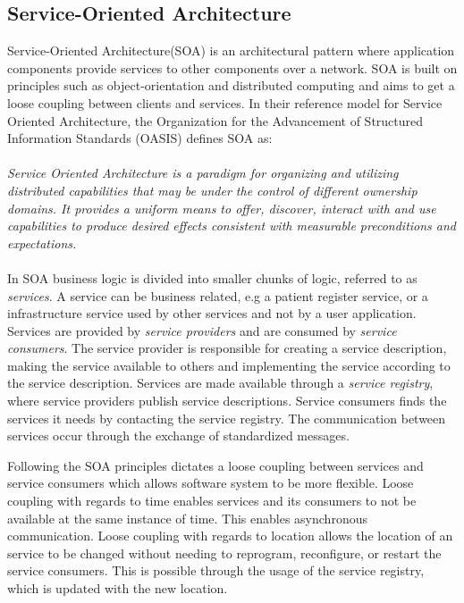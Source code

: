 \documentclass[USenglish]{article}
\begin{document}
\subsection{Service-Oriented Architecture}
Service-Oriented Architecture(SOA) is an architectural pattern where application components provide services to other components over a network. SOA is built on principles such as object-orientation and distributed computing and aims to get a loose coupling between clients and services. In their reference model for Service Oriented Architecture\cite{oasis-soa-reference-model}, the Organization for the Advancement of Structured Information Standards (OASIS) defines SOA as: 
\paragraph{}
\textit{Service Oriented Architecture is a paradigm for organizing and utilizing distributed capabilities that may be under the control of different ownership domains. It provides a uniform means to offer, discover, interact with and use capabilities to produce desired effects consistent with measurable preconditions and expectations.}

\paragraph{}
In SOA business logic is divided into smaller chunks of logic, referred to as \textit{services}. A service can be business related, e.g a patient register service, or a infrastructure service used by other services and not by a user application.  Services are provided by \textit{service providers} and are consumed by \textit{service consumers}. The service provider is responsible for creating a service description, making the service available to others and implementing the service according to the service description. Services are made available through a \textit{service registry}, where service providers publish service descriptions. Service consumers finds the services it needs by contacting the service registry. The communication between services occur through the exchange of standardized messages. 

Following the SOA principles dictates a loose coupling between services and service consumers which allows software system to be more flexible. Loose coupling with regards to time enables services and its consumers to not be available at the same instance of time. This enables asynchronous communication. Loose coupling with regards to location allows the location of an service to be changed without needing to reprogram, reconfigure, or restart the service consumers. This is possible through the usage of the service registry, which is updated with the new location.
\end{document}
